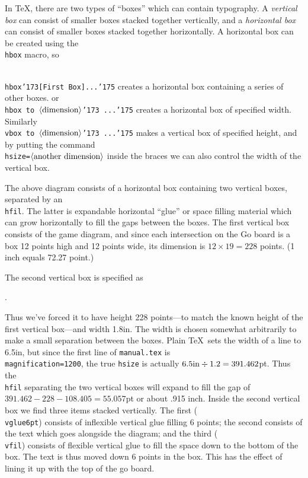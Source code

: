 In \TeX, there are two types of ``boxes'' which can contain typography. A {\it
vertical box} can consist of smaller boxes stacked together vertically, and a
{\it horizontal box} can consist of smaller boxes stacked together
horizontally. A horizontal box can be created using the {\tt\\hbox} macro,
so 

\vfil
{\tt\\hbox\char'173{\rm [First Box] ...}\char'175}
\vfil\noindent
creates a horizontal box containing a series of other boxes. or 
{\tt\\hbox to $\left<\hbox{\rm dimension}\right>$\char'173 ...\char'175}
creates a horizontal
box of specified width. Similarly
{\tt\\vbox to $\left<\hbox{\rm dimension}\right>$\char'173 ...\char'175} makes
a vertical box of specified height, and by putting the command
{\tt\\hsize=$\left<\hbox{\rm another dimension}\right>$} inside the braces we
can also control the width of the vertical box.

The above diagram consists of a horizontal box containing two vertical boxes,
separated by an {\tt\\hfil}. The latter is expandable horizontal ``glue'' or
space filling material which can grow horizontally to fill the gaps between
the boxes. The first vertical box consists of the game diagram, and since each
intersection on the Go board is a box 12 points high and 12 points wide, its
dimension is $12\times19=228$ points. (1 inch equals 72.27 point.)

The second vertical box is specified as

\vfil
\centerline{.}
\vfil

Thus we've forced it to have height 228 points---to match the known height of
the first vertical box---and width 1.8in. The width is chosen somewhat 
arbitrarily to make a small separation between the boxes. Plain \TeX\ sets
the width of a line to 6.5in, but since the first line of {\tt manual.tex} is
{\tt\\magnification=1200}, the true {\tt hsize} is actually 
$6.5{\rm in}\div1.2=391.462$pt. Thus the {\tt\\hfil} separating the two
vertical boxes will expand to fill the gap of $391.462-228-108.405=55.057$pt or
about .915 inch. Inside the second vertical box we find three items 
stacked vertically. The first ({\tt\\vglue6pt}) consists of inflexible vertical
glue filling 6 points; the second consists of the text which goes alongside
the diagram; and the third ({\tt\\vfil}) consists of flexible vertical glue to
fill the space down to the bottom of the box.  The text is thus moved down 6
points in the box. This has the effect of lining it up with the top of the go
board.

